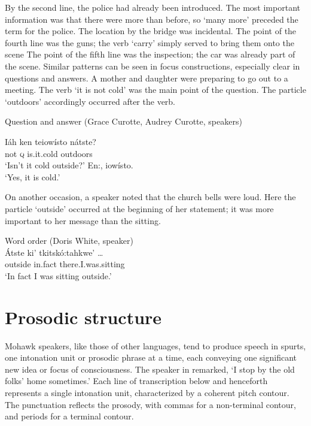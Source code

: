 \documentclass[output=paper,colorlinks,citecolor=brown]{langscibook}
\begin{document}
By the second line, the police had already been introduced. The most important information was that there were more than before, so `many more' preceded the term for the police. The location by the bridge was incidental. The point of the fourth line was the guns; the verb `carry' simply served to bring them onto the scene The point of the fifth line was the inspection; the car was already part of the scene.
Similar patterns can be seen in focus constructions, especially clear in questions and answers. A mother and daughter were preparing to go out to a meeting. The verb `it is not cold' was the main point of the question. The particle `outdoors' accordingly occurred after the verb.

\ea Question and answer (Grace Curotte, Audrey Curotte, speakers)\\\label{ex:mithun:4}
\begin{xlist}[MM]
\gll Iáh ken teiowísto nátste?\\
     not \textsc{q} {is.it.cold} outdoors\\
\glt `Isn't it cold outside?'
 En:, iowísto.\\
\glt `Yes, it is cold.'
\end{xlist}
\z

On another occasion, a speaker noted that the church bells were loud. Here the particle `outside' occurred at the beginning of her statement; it was more important to her message than the sitting.

\ea\label{ex:mithun:6} Word order (Doris White, speaker)\\
\gll Átste ki' tkitskó:tahkwe'  \ldots \\
     outside  {in.fact}  {there.I.was.sitting}\\
\glt `In fact I was sitting outside.'
\z

\section{Prosodic structure}
\begin{sloppypar}
Mohawk speakers, like those of other languages, tend to produce speech in spurts, one intonation unit or prosodic phrase at a time, each conveying one significant new idea or focus of consciousness. The speaker in  remarked, `I stop by the old folks' home sometimes.' Each line of transcription below and henceforth represents a single intonation unit, characterized by a coherent pitch contour. The punctuation reflects the prosody, with commas for a non-terminal contour, and periods for a terminal contour.
\end{sloppypar}
\end{document}
